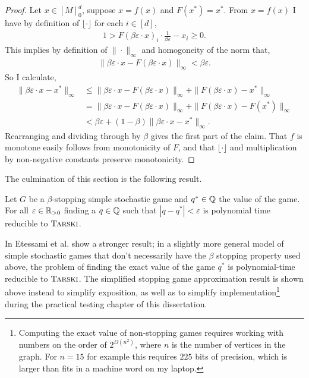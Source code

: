 \newcommand{\bed}{\beta \varepsilon \cdot}
\begin{proof}
  Let $x \in [M]_0^d$, suppose $x = f(x)$ and $F(x^*) = x^*$.
  From $x = f(x)$ I have by definition of $\lfloor \cdot \rfloor$
  for each $i \in [d]$,
  \begin{align*}
  1 > 
    F(\beta \varepsilon \cdot x)_i \cdot \frac{1}{\beta \varepsilon} - x_i
  \geq 0.
  \end{align*}
  This implies by definition of $\|\cdot\|_\infty$ and homogoneity of the norm that,
  \begin{align*}
    \|\beta \varepsilon \cdot x - F(\beta \varepsilon \cdot x) \|_\infty < \beta \varepsilon.
  \end{align*}
  So I calculate,
  \begin{align*}
    \|\bed x - x^* \|_\infty &\leq 
     \| \bed x - F(\bed x)\|_\infty + \|F(\bed x) - x^* \|_\infty  \\
    &= \| \bed x - F(\bed x)\|_\infty + \|F(\bed x) - F(x^*) \|_\infty  \\
    &< \beta \varepsilon + (1 - \beta)\|\bed x - x^*\|_\infty.
  \end{align*}
  Rearranging and dividing through by $\beta$ gives the first part of the claim.
  That $f$ is monotone easily follows from monotonicity of $F$, and that $\lfloor \cdot \rfloor$ and
  multiplication by non-negative constants preserve monotonicity.
\end{proof}
The culmination of this section is the following result.
\begin{theorem}
  Let $G$ be a $\beta$-stopping simple stochastic game and $q^* \in \mathbb{Q}$ the value of the game.
  For all $\varepsilon \in \mathbb{R}_{> 0}$ finding a $q \in \mathbb{Q}$ such that $|q - q^*| < \varepsilon$
  is polynomial time reducible to $\textsc{Tarski}$.
\end{theorem}
\begin{remark}
  In \citep{lowerBound} Etessami et al. show a stronger result; in a slightly more general
  model of simple stochastic games that don't necessarily have the $\beta$ stopping property used above,
  the problem of finding the exact value of the game $q^*$ is polynomial-time reducible to $\textsc{Tarski}$.
  The simplified stopping game approximation result is shown above instead to simplify exposition,
  as well as to simplify implementation\footnote{Computing the exact value of non-stopping games requires working with
  numbers on the order of $2^{\Omega(n^2)}$, where $n$ is the number of vertices in the graph. For $n = 15$ for example this requires $225$ bits
  of precision, which is larger than fits in a machine word on my laptop.} during the practical testing chapter of this dissertation.
\end{remark}
